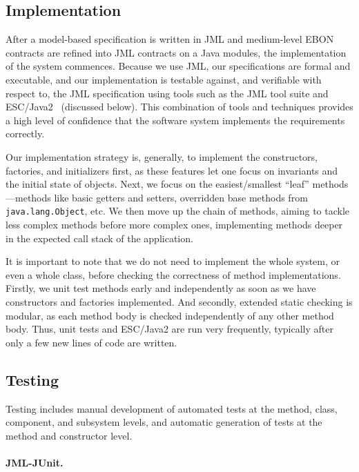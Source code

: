 \documentclass[letterpaper,twocolumn,10pt]{article}
\begin{document}
\subsection{Implementation}

After a model-based specification is written in JML and medium-level
EBON contracts are refined into JML contracts on a Java modules, the
implementation of the system commences.  Because we use JML, our
specifications are formal and executable, and our implementation is
testable against, and verifiable with respect to, the JML
specification using tools such as the JML tool suite and
ESC/Java2~\cite{ChalinEtal06,KiniryCok04} (discussed below).  This
combination of tools and techniques provides a high level of
confidence that the software system implements the requirements
correctly.

Our implementation strategy is, generally, to implement the
constructors, factories, and initializers first, as these features let
one focus on invariants and the initial state of objects.  Next, we
focus on the easiest/smallest ``leaf'' methods---methods like basic
getters and setters, overridden base methods from
\texttt{java.lang.Object}, etc.  We then move up the chain of methods,
aiming to tackle less complex methods before more complex ones,
implementing methods deeper in the expected call stack of the
application.

It is important to note that we do not need to implement the whole
system, or even a whole class, before checking the correctness of
method implementations.  Firstly, we unit test methods early and
independently as soon as we have constructors and factories
implemented.  And secondly, extended static checking is modular, as
each method body is checked independently of any other method body.
Thus, unit tests and ESC/Java2 are run very frequently, typically
after only a few new lines of code are written.

\subsection{Testing}

Testing includes manual development of automated tests at the method,
class, component, and subsystem levels, and automatic generation of
tests at the method and constructor level.

\paragraph{JML-JUnit.}
\end{document}
